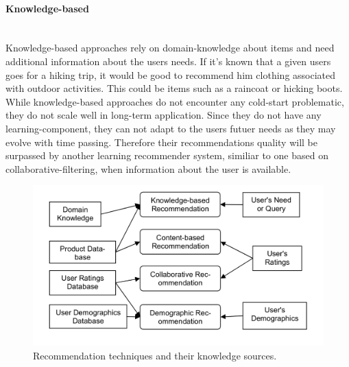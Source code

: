 \paragraph{Knowledge-based}\hfill\\
Knowledge-based approaches rely on domain-knowledge about items and need additional information about the users needs.
\citep[p.~12-13]{ricci:2011}
If it's known that a given users goes for a hiking trip, it would be good to recommend him clothing associated with outdoor activities.
This could be items such as a raincoat or hicking boots.
\\
While knowledge-based approaches do not encounter any cold-start problematic, they do not scale well in long-term application.
Since they do not have any learning-component, they can not adapt to the users futuer needs as they may evolve with time passing.
Therefore their recommendations quality will be surpassed by another learning recommender system, similiar to one based on collaborative-filtering, when information about the user is available.
\citep[p.~12-13]{ricci:2011}

\begin{figure}[h]
    \center
    \includegraphics[scale=0.3]{inc/recommendersystems/RecommendationTechniquesAndKnowledgeSources.png}
    \caption{Recommendation techniques and their knowledge sources.\citep[p.~379]{burke:2007}}
\end{figure}

